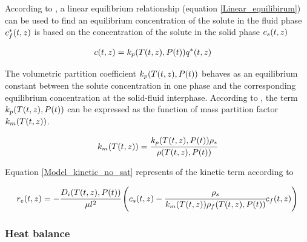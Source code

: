 \documentclass[../Article_Sensitivity_Analsysis.tex]{subfiles}
\begin{document}
		According to \citet{Bulley1984}, a linear equilibrium relationship (equation  \ref{Linear_equilibirum}) can be used to find an equilibrium concentration of the solute in the fluid phase ${\color{black}c_f^*}(t,z)$ is based on the concentration of the solute in the solid phase ${\color{black}c_s}(t,z)$ 
			
			{\footnotesize
				\begin{align} \label{Linear_equilibirum}
					{\color{black}c}(t,z) &= {\color{black}k_p}({\color{black}T}(t,z),{\color{black}P}(t)) \allowbreak {\color{black}q^*}(t,z)
			\end{align} }
			
			The volumetric partition coefficient ${\color{black}k_p}({\color{black}T}(t,z),{\color{black}P}(t))$ behaves as an equilibrium constant between the solute concentration in one phase and the corresponding equilibrium concentration at the solid-fluid interphase. According to \citet{Spiro2007}, the term ${\color{black}k_p}({\color{black}T}(t,z),{\color{black}P}(t))$ can be expressed as the function of mass partition factor ${\color{black}k_m}({\color{black}T}(t,z))$.
			
			{\footnotesize
				\begin{align}
					{\color{black}k_m}({\color{black}T}(t,z)) = \cfrac{{\color{black}k_p}({\color{black}T}(t,z),{\color{black}P}(t)) {\color{black}\rho_s}}{{\color{black}\rho}({\color{black}T}(t,z),{\color{black}P}(t))}
			\end{align} }
			
			Equation \ref{Model_kinetic_no_sat} represents of the kinetic term according to \citet{Reverchon1996}
			
			{\footnotesize
				\begin{equation}
					\label{Model_kinetic_no_sat}
					{\color{black}r_e}(t,z) = -\cfrac{{\color{black}D_i}({\color{black}T}(t,z), {\color{black}P}(t))}{{\color{black} \mu l^2} }\left({\color{black}c_s}(t,z) - \cfrac{{\color{black}\rho_s}}{{\color{black}k_m}({\color{black}T}(t,z)){\color{black}\rho_f}({\color{black}T}(t,z),{\color{black}P}(t))}  {\color{black}c_f}(t,z) \right)
			\end{equation} }

        
			
		\subsubsection{Heat balance} \label{CH: heat_balance}
		
\end{document}
